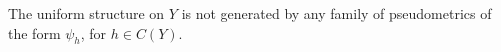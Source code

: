 The uniform structure on $Y$ is not generated by any family of pseudometrics of the form $\psi_h$, for $h \in C(Y)$.
